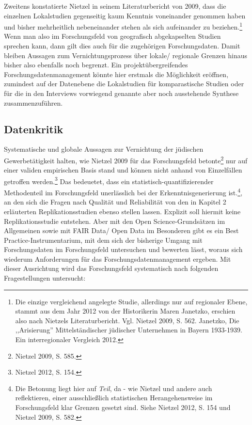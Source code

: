Zweitens konstatierte Nietzel in seinem Literaturbericht von 2009, dass die einzelnen Lokalstudien gegenseitig kaum Kenntnis voneinander genommen haben und bisher mehrheitlich nebeneinander stehen als sich aufeinander zu beziehen.\footnote{Die einzige vergleichend angelegte Studie, allerdings nur auf regionaler Ebene, stammt aus dem Jahr 2012 von der Historikerin Maren Janetzko, erschien also nach Nietzels Literaturbericht. Vgl. Nietzel 2009, S. 562. Janetzko, Die ,,Arisierung'' Mittelständischer jüdischer Unternehmen in Bayern 1933-1939. Ein interregionaler Vergleich 2012.} Wenn man also im Forschungsfeld von geografisch abgekapselten Studien sprechen kann, dann gilt dies auch für die zugehörigen Forschungsdaten. Damit bleiben Aussagen zum Vernichtungsprozess über lokale/ regionale Grenzen hinaus bisher also ebenfalls noch begrenzt. Ein projektübergreifendes Forschungsdatenmanagement könnte hier erstmals die Möglichkeit eröffnen, zumindest auf der Datenebene die Lokalstudien für komparastische Studien oder für die in den Interviews vorwiegend genannte aber noch ausstehende Synthese zusammenzuführen.

\subsection{Datenkritik}
Systematische und globale Aussagen zur Vernichtung der jüdischen Gewerbetätigkeit halten, wie Nietzel 2009 für das Forschungsfeld betonte\footnote{Nietzel 2009, S. 585.} nur auf einer validen empirischen Basis stand und können nicht anhand von Einzelfällen getroffen werden.\footnote{Nietzel 2012, S. 154.} Das bedeuetet, dass ein statistisch-quantifizierender Methodenteil im Forschungsfeld unerlässlich bei der Erkenntnisgenerierung ist.\footnote{Die Betonung liegt hier auf \textit{Teil}, da - wie Nietzel und andere auch reflektieren, einer ausschließlich statistischen Herangehensweise im Forschungsfeld klar Grenzen gesetzt sind. Siehe Nietzel 2012, S. 154 und Nietzel 2009, S. 582.}, an den sich die Fragen nach Qualität und Reliabilität von den in Kapitel 2 erläuterten Replikationsstudien ebenso stellen lassen. Explizit soll hiermit keine Replikationsstudie entstehen. Aber mit den Open Science-Grundsätzen im Allgemeinen sowie mit FAIR Data/ Open Data im Besonderen gibt es ein Best Practice-Instrumentarium, mit dem sich der bisherige Umgang mit Forschungsdaten im Forschungsfeld untersuchen und bewerten lässt, woraus sich wiederum Anforderungen für das Forschungsdatenmanagement ergeben. Mit dieser Ausrichtung wird das Forschungsfeld systematisch nach folgenden Fragestellungen untersucht:

